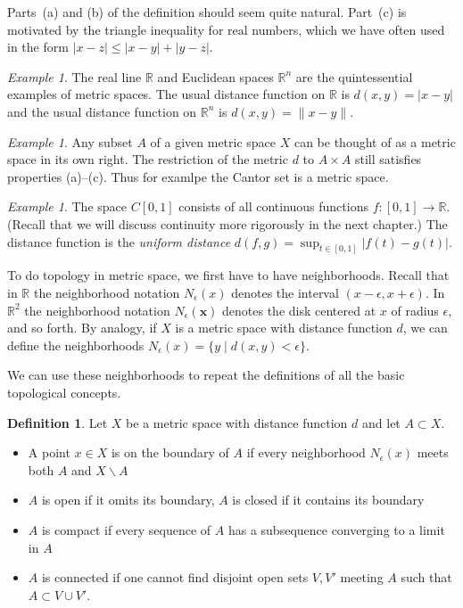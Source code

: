 \documentclass[11pt,oneside]{amsbook}
\newcommand{\R}{\mathbb R}
\renewcommand{\setminus}{\smallsetminus}
\theoremstyle{definition}
\theoremstyle{plain}
\theoremstyle{definition}
\newtheorem{definition}[theorem]{Definition}
\theoremstyle{remark}
\newtheorem{example}[theorem]{Example}
\numberwithin{equation}{section}
\numberwithin{figure}{section}
\begin{document}
Parts~(a) and (b) of the definition should seem quite natural. Part~(c) is motivated by the triangle inequality for real numbers, which we have often used in the form $|x-z|\leq|x-y|+|y-z|$.

\begin{example}
  The real line $\R$ and Euclidean spaces $\R^n$ are the quintessential examples of metric spaces. The usual distance function on $\R$ is $d(x,y)=|x-y|$ and the usual distance function on $\R^n$ is $d(x,y)=\|x-y\|$.
\end{example}

\begin{example}
  Any subset $A$ of a given metric space $X$ can be thought of as a metric space in its own right. The restriction of the metric $d$ to $A\times A$ still satisfies properties (a)--(c). Thus for examlpe the Cantor set is a metric space.
\end{example}

\begin{example}
  The space $C[0,1]$ consists of all continuous functions $f\colon[0,1]\to\R$. (Recall that we will discuss continuity more rigorously in the next chapter.) The distance function is the \emph{uniform distance} $d(f,g)=\sup_{t\in[0,1]}|f(t)-g(t)|$.
\end{example}

To do topology in metric space, we first have to have neighborhoods. Recall that in $\R$ the neighborhood notation $N_\epsilon(x)$ denotes the interval $(x-\epsilon,x+\epsilon)$. In $\R^2$ the neighborhood notation $N_\epsilon(\mathbf{x})$ denotes the disk centered at $x$ of radius $\epsilon$, and so forth. By analogy, if $X$ is a metric space with distance function $d$, we can define the neighborhoods $N_\epsilon(x)=\{y\mid d(x,y)<\epsilon\}$.

We can use these neighborhoods to repeat the definitions of all the basic topological concepts.

\begin{definition}
  Let $X$ be a metric space with distance function $d$ and let $A\subset X$.
  \begin{itemize}
  \item A point $x\in X$ is on the boundary of $A$ if every neighborhood $N_\epsilon(x)$ meets both $A$ and $X\setminus A$
  \item $A$ is open if it omits its boundary, $A$ is closed if it contains its boundary
  \item $A$ is compact if every sequence of $A$ has a subsequence converging to a limit in $A$
  \item $A$ is connected if one cannot find disjoint open sets $V,V'$ meeting $A$ such that $A\subset V\cup V'$.
  \end{itemize}
\end{definition}
\end{document}
